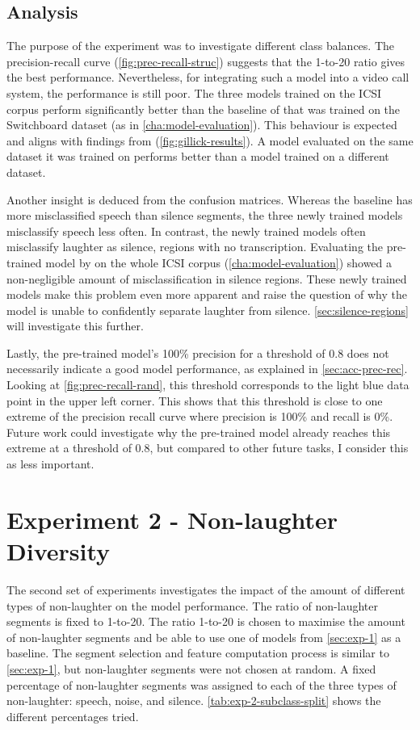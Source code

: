 \documentclass[bsc,frontabs,parskip,deptreport]{infthesis}
\begin{document}
\subsection{Analysis} 
The purpose of the experiment was to investigate different class balances. 
The precision-recall curve (\autoref{fig:prec-recall-struc}) suggests that the 1-to-20 ratio gives the best performance. Nevertheless, for integrating such a model into a video call system, the performance is still poor. 
The three models trained on the ICSI corpus perform significantly better than the baseline of \citet{gillick2021robust} that was trained on the Switchboard dataset (as in \autoref{cha:model-evaluation}).
This behaviour is expected and aligns with findings from \citet{gillick2021robust} (\autoref{fig:gillick-results}). A model evaluated on the same dataset it was trained on performs better than a model trained on a different dataset. 

Another insight is deduced from the confusion matrices. Whereas the baseline has more misclassified speech than silence segments, the three newly trained models misclassify speech less often. 
In contrast, the newly trained models often misclassify laughter as silence, regions with no transcription.
Evaluating the pre-trained model by \citet{gillick2021robust} on the whole ICSI corpus (\autoref{cha:model-evaluation}) showed a non-negligible amount of misclassification in silence regions. 
These newly trained models make this problem even more apparent and raise the question of why the model is unable to confidently separate laughter from silence. \autoref{sec:silence-regions} will investigate this further.

Lastly, the pre-trained model's 100\% precision for a threshold of 0.8 does not necessarily indicate a good model performance, as explained in \autoref{sec:acc-prec-rec}. Looking at \autoref{fig:prec-recall-rand}, this threshold corresponds to the light blue data point in the upper left corner. This shows that this threshold is close to one extreme of the precision recall curve where precision is 100\% and recall is 0\%. Future work could investigate why the pre-trained model already reaches this extreme at a threshold of 0.8, but compared to other future tasks, I consider this as less important.

\section{Experiment 2 - Non-laughter Diversity} \label{sec:exp2}
The second set of experiments investigates the impact of the amount of different types of non-laughter on the model performance. 
The ratio of non-laughter segments is fixed to 1-to-20. The ratio 1-to-20 is chosen to maximise the amount of non-laughter segments and be able to use one of models from \autoref{sec:exp-1} as a baseline.
The segment selection and feature computation process is similar to \autoref{sec:exp-1}, but non-laughter segments were not chosen at random. A fixed percentage of non-laughter segments was assigned to each of the three types of non-laughter: speech, noise, and silence.
\autoref{tab:exp-2-subclass-split} shows the different percentages tried.
\end{document}
